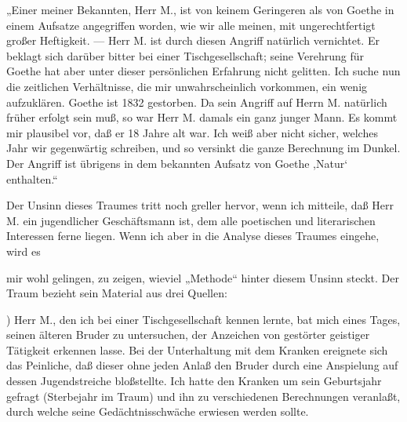 \documentclass[twoside=true,titlepage=false,open=any, parskip=never, fontsize=10pt, headings=small, chapterprefix=false, appendixprefix=false]{scrbook}
\begin{document}
            
        \pstart
        „Einer meiner Bekannten, Herr M., ist von keinem Geringeren als
                  von Goethe in einem Aufsatze angegriffen worden, wie wir alle meinen, mit
                  ungerechtfertigt großer Heftigkeit. — Herr M. ist durch diesen Angriff natürlich
                  vernichtet. Er beklagt sich darüber bitter bei einer Tischgesellschaft; seine
                  Verehrung für Goethe hat aber unter dieser persönlichen Erfahrung nicht gelitten.
                  Ich suche nun die zeitlichen Verhältnisse, die mir unwahrscheinlich vorkommen, ein
                  wenig aufzuklären. Goethe ist 1832 gestorben. Da sein Angriff auf Herrn M.
                  natürlich früher erfolgt sein muß, so war Herr M. damals ein ganz junger Mann. Es
                  kommt mir plausibel vor, daß er 18 Jahre alt war. Ich weiß aber nicht sicher,
                  welches Jahr wir gegenwärtig schreiben, und so versinkt die ganze Berechnung im
                  Dunkel. Der Angriff ist übrigens in dem bekannten Aufsatz von Goethe ,Natur‘
                  enthalten.“
        \pend
    
            
        \pstart
        Der Unsinn dieses Traumes tritt noch greller hervor, wenn ich mitteile, daß Herr
               M. ein jugendlicher Geschäftsmann ist, dem alle poetischen und literarischen
               Interessen ferne liegen. Wenn ich aber in die Analyse dieses Traumes eingehe,
               wird es
        \pend
    
         
            
            
            
        \pstart
        mir wohl gelingen, zu zeigen, wieviel „Methode“ hinter diesem Unsinn
               steckt. Der Traum bezieht sein Material aus drei Quellen:
        \pend
    
            
        ) Herr M., den ich bei einer Tischgesellschaft kennen lernte, bat mich eines Tages, seinen älteren
               Bruder zu untersuchen, der Anzeichen von gestörter geistiger Tätigkeit erkennen lasse. Bei der Unterhaltung mit dem Kranken ereignete sich das
               Peinliche, daß dieser ohne jeden Anlaß den Bruder durch eine Anspielung auf
               dessen Jugendstreiche bloßstellte. Ich hatte den Kranken um sein
               Geburtsjahr gefragt (Sterbejahr im Traum) und ihn zu verschiedenen Berechnungen veranlaßt,
               durch welche seine Gedächtnisschwäche erwiesen werden sollte.
        \pend
    
\end{document}
